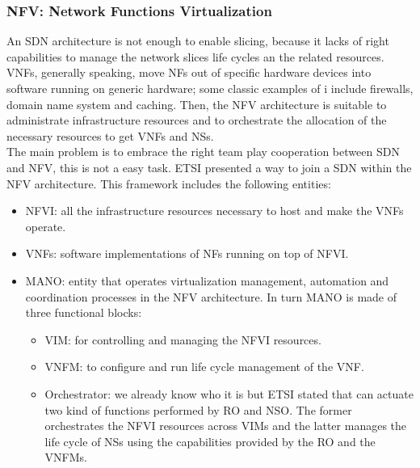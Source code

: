 \documentclass[a4paper,12pt]{report} %
\begin{document}
\subsubsection{NFV: Network Functions Virtualization}
An SDN architecture is not enough to enable slicing, because it lacks of right capabilities
to manage the network slices life cycles an the related resources. \\
VNFs, generally speaking, move NFs out of specific hardware devices into software running on generic hardware; some classic examples of i include firewalls, domain name system and caching. Then, the NFV architecture is suitable to administrate infrastructure resources and to orchestrate the allocation of the necessary resources to get VNFs and NSs.\\
The main problem is to embrace the right team play cooperation between SDN and NFV, this is not a easy task. ETSI presented a way to join a SDN within the NFV architecture. This framework includes the following entities:\\
\begin{itemize}
\item \gls{NFVI}: all the infrastructure resources necessary to host and make the VNFs operate.
\end{itemize}
\begin{itemize}
\item VNFs: software implementations of NFs running on top of NFVI.
\end{itemize}
\begin{itemize}
\item \gls{MANO}: entity that operates virtualization management, automation and coordination processes in the NFV architecture. In turn MANO is made of three functional blocks:
\begin{itemize}
\item \gls{VIM}: for controlling and managing the NFVI resources.
\end{itemize}
\begin{itemize}
\item \gls{VNFM}: to configure and run life cycle management of the VNF.
\end{itemize}
\begin{itemize}
\item Orchestrator: we already know who it is but ETSI stated that can actuate two kind of functions performed by \gls{RO} and \gls{NSO}. The former orchestrates the NFVI resources across VIMs and the latter manages the life cycle of NSs using the capabilities provided by the RO and the VNFMs.
\end{itemize}
\end{itemize}
\end{document}
